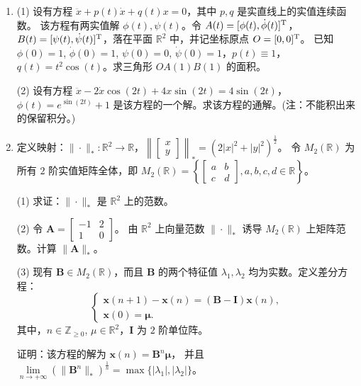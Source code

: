 \begin{enumerate}
\item[7.]
(1)
设有方程 $\ddot{x} + p(t)\dot{x} + q(t)x = 0$，其中 $p, q$ 是实直线上的实值连续函数。
该方程有两实值解 $\phi(t), \psi(t)$。令 $A(t) = [\phi(t), \dot{\phi}(t)]^{\rm T}$，
$B(t) = [\psi(t), \dot{\psi}(t)]^{\rm T}$，落在平面 $\mathbb{R}^2$ 中，并记坐标原点 $O = [0, 0]^{\rm T}$。
已知 $\phi(0) = 1$, $\dot{\phi}(0) = 1$, $\psi(0) = 0$, $\dot{\psi}(0) = 1$，$p(t) \equiv 1$，$q(t) = t^2 \cos(t)$。求三角形 $OA(1)B(1)$ 的面积。

(2)
设有方程 $\ddot{x} - 2\dot{x}\cos(2t) + 4x\sin(2t) = 4\sin(2t)$，$\phi(t) = e^{\sin(2t)} + 1$ 是该方程的一个解。求该方程的通解。(注：不能积出来的保留积分。)



\item[8.]定义映射：$\| \cdot \|_* : \mathbb{R}^2 \to \mathbb{R}$，$\left\| \begin{bmatrix} x \\ y \end{bmatrix} \right\|_* = (2|x|^2 + |y|^2)^{\frac{1}{2}}$。
令 $M_2(\mathbb{R})$ 为所有 $2$ 阶实值矩阵全体，即 $M_2(\mathbb{R}) = \left\{ \begin{bmatrix} a & b \\ c & d \end{bmatrix}, a, b, c, d \in \mathbb{R} \right\}$。

(1)
求证：$\| \cdot \|_*$ 是 $\mathbb{R}^2$ 上的范数。

(2)
令 $\boldsymbol{A} = \begin{bmatrix} -1 & 2 \\ 1 & 0 \end{bmatrix}$。
由 $\mathbb{R}^2$ 上向量范数 $\| \cdot \|_*$ 诱导 $M_2(\mathbb{R})$ 上矩阵范数。计算 $\| \boldsymbol{A} \|_*$。

(3)
现有 $\boldsymbol{B} \in M_2(\mathbb{R})$，而且 $\boldsymbol{B}$ 的两个特征值 $\lambda_1, \lambda_2$ 均为实数。定义差分方程：
\[
\begin{cases}
\boldsymbol{x}(n+1) - \boldsymbol{x}(n) = (\boldsymbol{B} - \boldsymbol{I})\boldsymbol{x}(n), \\
\boldsymbol{x}(0) = \boldsymbol{\mu}.
\end{cases}
\]
其中，$n \in \mathbb{Z}_{\geqslant 0}$, $\mu \in \mathbb{R}^2$，$\boldsymbol{I}$ 为 $2$ 阶单位阵。

证明：该方程的解为 $\boldsymbol{x}(n) = \boldsymbol{B}^n\boldsymbol{\mu}$，
并且 $\lim\limits_{n \to +\infty} (\| \boldsymbol{B}^n \|_*)^{\frac{1}{n}} = \max\{|\lambda_1|, |\lambda_2|\}$。
\end{enumerate}
